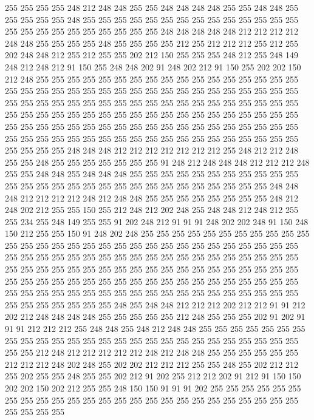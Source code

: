 255 255 255 255 248 212 248 248 255 255 248 248 248 248 255 255 248 248 255 255
255 255 255 248 255 255 255 255 255 255 255 255 255 255 255 255 255 255 255 255
255 255 255 255 255 255 255 255 248 248 248 248 248 212 212 212 212 248 248 255
255 255 255 248 255 255 255 255 212 255 212 212 212 255 212 255 202 248 248 212
255 212 255 255 202 212 150 255 255 255 248 212 255 248 149 248 212 248 212 91
150 255 248 248 202 91 248 202 212 91 150 255 202 202 150 212 248 255 255 255
255 255 255 255 255 255 255 255 255 255 255 255 255 255 255 255 255 255 255 255
255 255 255 255 255 255 255 255 255 255 255 255 255 255 255 255 255 255 255 255
255 255 255 255 255 255 255 255 255 255 255 255 255 255 255 255 255 255 255 255
255 255 255 255 255 255 255 255 255 255 255 255 255 255 255 255 255 255 255 255
255 255 255 255 255 255 255 255 255 255 255 255 255 255 255 255 255 255 255 255
255 255 255 255 255 255 255 255 255 255 255 255 255 248 248 248 212 212 212 212
212 212 212 255 248 212 212 248 255 255 248 255 255 255 255 255 255 255 91 248
212 248 248 248 212 212 212 248 255 255 248 248 255 248 248 248 255 255 255 255
255 255 255 255 255 255 255 255 255 255 255 255 255 255 255 255 255 255 255 255
255 255 255 255 248 248 248 212 212 212 212 248 212 248 248 255 255 255 255 255
255 255 255 248 212 248 202 212 255 255 150 255 212 248 212 202 248 255 248 248
212 248 212 255 255 234 255 248 149 255 255 91 202 248 212 91 91 91 248 202
202 248 91 150 248 150 212 255 255 150 91 248 202 248 255 255 255 255 255 255
255 255 255 255 255 255 255 255 255 255 255 255 255 255 255 255 255 255 255 255
255 255 255 255 255 255 255 255 255 255 255 255 255 255 255 255 255 255 255 255
255 255 255 255 255 255 255 255 255 255 255 255 255 255 255 255 255 255 255 255
255 255 255 255 255 255 255 255 255 255 255 255 255 255 255 255 255 255 255 255
255 255 255 255 255 255 255 255 255 255 255 255 255 255 255 255 255 255 255 255
255 255 255 255 255 255 255 248 255 248 248 212 212 212 202 212 212 91 91 212
202 212 248 248 248 248 255 255 255 255 255 212 248 255 255 255 202 91 202 91
91 91 212 212 212 255 248 248 255 248 212 248 248 255 255 255 255 255 255 255
255 255 255 255 255 255 255 255 255 255 255 255 255 255 255 255 255 255 255 255
255 212 248 212 212 212 212 212 248 212 248 248 255 255 255 255 255 255 212 212
212 248 202 248 255 202 202 212 212 212 255 255 248 255 202 212 212 255 202 255
255 248 255 255 202 212 91 202 255 212 212 202 91 212 91 150 150 202 202 150
202 212 255 255 248 150 150 91 91 91 202 255 255 255 255 255 255 255 255 255
255 255 255 255 255 255 255 255 255 255 255 255 255 255 255 255 255 255 255 255
